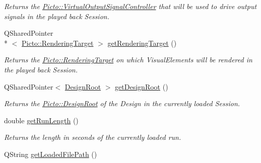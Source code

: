 \begin{DoxyCompactItemize}
\begin{DoxyCompactList}\small\item\em Returns the \hyperlink{class_picto_1_1_virtual_output_signal_controller}{Picto\-::\-Virtual\-Output\-Signal\-Controller} that will be used to drive output signals in the played back Session. \end{DoxyCompactList}\item 
\hypertarget{class_playback_controller_a4c221358136b7f5544c0e5b6e4d6a8a7}{Q\-Shared\-Pointer\\*
$<$ \hyperlink{struct_picto_1_1_rendering_target}{Picto\-::\-Rendering\-Target} $>$ \hyperlink{class_playback_controller_a4c221358136b7f5544c0e5b6e4d6a8a7}{get\-Rendering\-Target} ()}\label{class_playback_controller_a4c221358136b7f5544c0e5b6e4d6a8a7}

\begin{DoxyCompactList}\small\item\em Returns the \hyperlink{struct_picto_1_1_rendering_target}{Picto\-::\-Rendering\-Target} on which Visual\-Elements will be rendered in the played back Session. \end{DoxyCompactList}\item 
\hypertarget{class_playback_controller_ab02b01dd39b753e7315ae3bc4c98dc31}{Q\-Shared\-Pointer$<$ \hyperlink{class_picto_1_1_design_root}{Design\-Root} $>$ \hyperlink{class_playback_controller_ab02b01dd39b753e7315ae3bc4c98dc31}{get\-Design\-Root} ()}\label{class_playback_controller_ab02b01dd39b753e7315ae3bc4c98dc31}

\begin{DoxyCompactList}\small\item\em Returns the \hyperlink{class_picto_1_1_design_root}{Picto\-::\-Design\-Root} of the Design in the currently loaded Session. \end{DoxyCompactList}\item 
\hypertarget{class_playback_controller_af0189e9dcebeccd8a884e01e3061776f}{double \hyperlink{class_playback_controller_af0189e9dcebeccd8a884e01e3061776f}{get\-Run\-Length} ()}\label{class_playback_controller_af0189e9dcebeccd8a884e01e3061776f}

\begin{DoxyCompactList}\small\item\em Returns the length in seconds of the currently loaded run. \end{DoxyCompactList}\item 
\hypertarget{class_playback_controller_a00184478680d0042e3a745c9a81e2fda}{Q\-String \hyperlink{class_playback_controller_a00184478680d0042e3a745c9a81e2fda}{get\-Loaded\-File\-Path} ()}\label{class_playback_controller_a00184478680d0042e3a745c9a81e2fda}


\end{DoxyCompactItemize}
